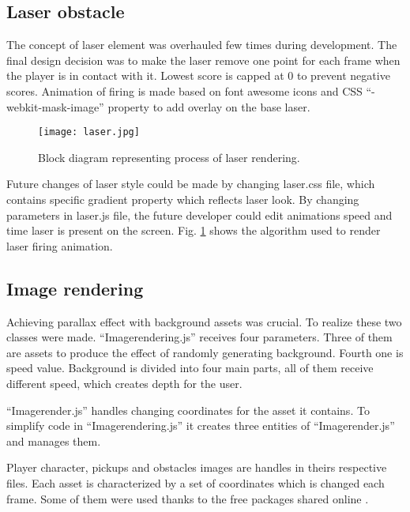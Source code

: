 \documentclass[oneside,a4paper,11pt]{report}
\begin{document}
\subsection{Laser obstacle}
The concept of laser element was overhauled few times during development. The final design decision was to make the laser remove one point for each frame when the player is in contact with it. Lowest score is capped at 0 to prevent negative scores. Animation of firing is made based on font awesome icons and CSS “-webkit-mask-image” property to add overlay on the base laser.

\begin{figure}
	\centering
	\texttt{[image: laser.jpg]}
	\caption{Block diagram representing process of laser rendering.\label{fig:laser}}
\end{figure}

\par
Future changes of laser style could be made by changing laser.css file, which contains specific gradient property which reflects laser look. By changing parameters in laser.js file, the future developer could edit animations speed and time laser is present on the screen. Fig. \ref{fig:laser} shows the algorithm used to render laser firing animation.

\subsection{Image rendering}
Achieving parallax effect with background assets was crucial. To realize these two classes were made. “Image\textunderscore rendering.js” receives four parameters. Three of them are assets to produce the effect of randomly generating background. Fourth one is speed value. Background is divided into four main parts, all of them receive different speed, which creates depth for the user. 

\par
“Image\textunderscore render.js” handles changing coordinates for the asset it contains. To simplify code in “Image\textunderscore rendering.js” it creates three entities of “Image\textunderscore render.js” and manages them.

\par
Player character, pickups and obstacles images are handles in theirs respective files. Each asset is characterized by a set of coordinates which is changed each frame. Some of them were used thanks to the free packages shared online \cite{Facade009} \cite{Kitbash}.
\end{document}
